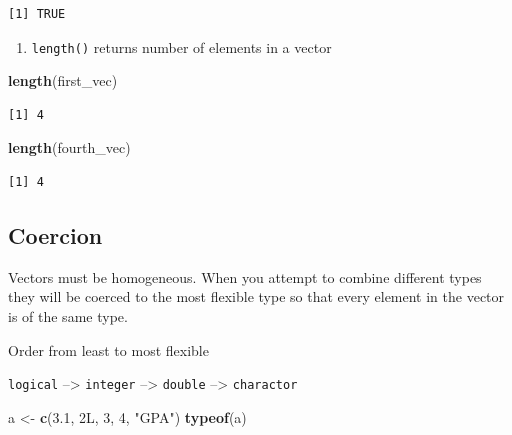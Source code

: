 \documentclass[
]{book}
\newenvironment{Shaded}{\begin{snugshade}}{\end{snugshade}}
\newcommand{\DecValTok}[1]{\textcolor[rgb]{0.00,0.00,0.81}{#1}}
\newcommand{\FloatTok}[1]{\textcolor[rgb]{0.00,0.00,0.81}{#1}}
\newcommand{\KeywordTok}[1]{\textcolor[rgb]{0.13,0.29,0.53}{\textbf{#1}}}
\newcommand{\NormalTok}[1]{#1}
\newcommand{\StringTok}[1]{\textcolor[rgb]{0.31,0.60,0.02}{#1}}
\providecommand{\tightlist}{%
  \setlength{\itemsep}{0pt}\setlength{\parskip}{0pt}}
\begin{document}
\begin{verbatim}
[1] TRUE
\end{verbatim}

\begin{enumerate}
\def\labelenumi{\arabic{enumi}.}
\setcounter{enumi}{2}
\tightlist
\item
  \texttt{length()} returns number of elements in a vector
\end{enumerate}

\begin{Shaded}
\begin{Highlighting}[]
\KeywordTok{length}\NormalTok{(first_vec)}
\end{Highlighting}
\end{Shaded}

\begin{verbatim}
[1] 4
\end{verbatim}

\begin{Shaded}
\begin{Highlighting}[]
\KeywordTok{length}\NormalTok{(fourth_vec)}
\end{Highlighting}
\end{Shaded}

\begin{verbatim}
[1] 4
\end{verbatim}

\hypertarget{coercion}{%
\subsection{Coercion}\label{coercion}}

Vectors must be homogeneous. When you attempt to combine different types they will be coerced to the most flexible type so that every element in the vector is of the same type.

Order from least to most flexible

\texttt{logical} --\textgreater{} \texttt{integer} --\textgreater{} \texttt{double} --\textgreater{} \texttt{charactor}

\begin{Shaded}
\begin{Highlighting}[]
\NormalTok{a <-}\StringTok{ }\KeywordTok{c}\NormalTok{(}\FloatTok{3.1}\NormalTok{, 2L, }\DecValTok{3}\NormalTok{, }\DecValTok{4}\NormalTok{, }\StringTok{"GPA"}\NormalTok{) }
\KeywordTok{typeof}\NormalTok{(a) }
\end{Highlighting}
\end{Shaded}
\end{document}
